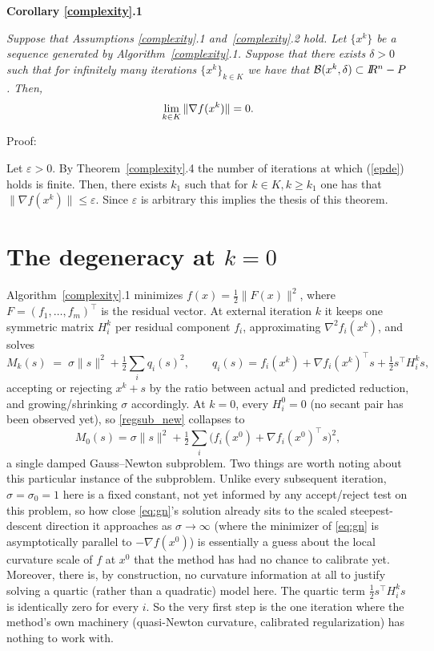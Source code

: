 \documentclass{article}
\newcommand{\R}         {I\!\!R}
\newcommand{\B}{{\cal B}}
\newcommand{\norm}[1]{\|#1\|}
\begin{document}
\noindent
{\bf Corollary \ref{complexity}.1} {\it  Suppose that Assumptions \ref{complexity}.1 and~\ref{complexity}.2 hold. Let
  $\{x^k\}$ be a sequence generated by Algorithm~\ref{complexity}.1. Suppose that there exists $\delta > 0$ such that
  for infinitely many iterations $\{x^k\}_{k \in K}$ we have that $\B(x^k, \delta) \subset \R^n - P$. Then,
\[
\lim_{k \in K} \|\nabla f(x^k)\| = 0. \\
\]

\noindent
Proof: }  Let $\varepsilon > 0$. By Theorem~\ref{complexity}.4 the number of iterations at which (\ref{epde}) holds is finite.
   Then, there exists $k_1$ such that for $k \in K, k \geq k_1$ one has that $\| \nabla f(x^k) \| \leq \varepsilon$.  Since
  $\varepsilon$ is arbitrary this implies the thesis of this theorem. \\



   
   

\section{The degeneracy at $k=0$} \label{sec:degeneracy}

Algorithm~\ref{complexity}.1 minimizes $f(x) = \tfrac12\norm{F(x)}^2$, where
$F=(f_1,\dots,f_m)^\top$ is the residual vector. At external iteration $k$
it keeps one symmetric matrix $H_i^k$ per residual component $f_i$,
approximating $\nabla^2 f_i(x^k)$, and solves
\begin{equation}
	M_k(s) \;=\; \sigma\norm{s}^2 + \tfrac12\sum_i q_i(s)^2, \qquad
	q_i(s) = f_i(x^k) + \nabla f_i(x^k)^\top s + \tfrac12 s^\top H_i^k s,
	\label{regsub_new}
\end{equation}
accepting or rejecting $x^k+s$ by the ratio between actual and predicted
reduction, and growing/shrinking $\sigma$ accordingly. At $k=0$, every $H_i^0=0$ (no secant pair has been observed yet), so
\eqref{regsub_new} collapses to
\begin{equation}
	M_0(s) = \sigma\norm{s}^2 + \tfrac12\sum_i \bigl(f_i(x^0) + \nabla f_i(x^0)^\top s\bigr)^2,
	\label{eq:gn}
\end{equation}
a single damped Gauss--Newton subproblem. Two things are worth noting
about this particular instance of the subproblem. Unlike every subsequent
iteration, $\sigma=\sigma_0=1$ here is a fixed constant, not yet informed
by any accept/reject test on this problem, so how close
\eqref{eq:gn}'s solution already sits to the scaled steepest-descent
direction it approaches as $\sigma\to\infty$ (where the minimizer of
\eqref{eq:gn} is asymptotically parallel to $-\nabla f(x^0)$) is
essentially a guess about the local curvature scale of $f$ at $x^0$ that
the method has had no chance to calibrate yet. Moreover, there is, by
construction, no curvature
information at all to justify solving a quartic (rather than a quadratic)
model here. The quartic term $\tfrac12 s^\top H_i^k s$ is identically zero
for every $i$. So the very first step is the one iteration where the
method's own machinery (quasi-Newton curvature, calibrated regularization)
has nothing to work with.
\end{document}
